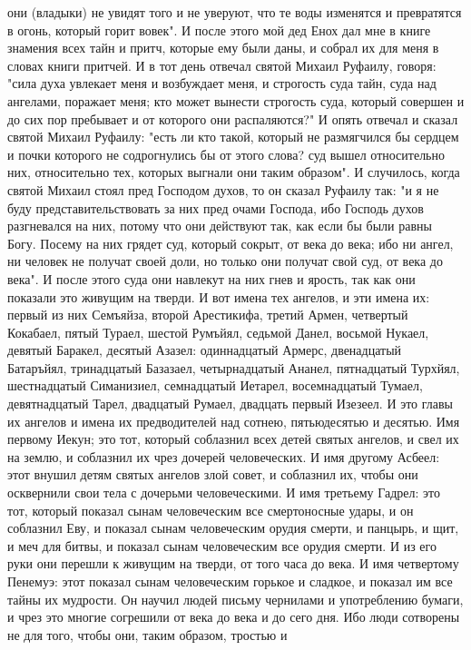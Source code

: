 они (владыки) не увидят того и не уверуют, что те воды изменятся и превратятся
в огонь, который горит вовек".
И после этого мой дед Енох дал мне в книге знамения всех тайн и
притч, которые ему были даны, и собрал их для меня в словах книги притчей.
И в тот день отвечал святой Михаил Руфаилу, говоря: "сила духа увлекает
меня и возбуждает меня, и строгость суда тайн, суда над ангелами, поражает
меня; кто может вынести строгость суда, который совершен и до сих пор пребывает
и от которого они распаляются?"
И опять отвечал и сказал святой Михаил Руфаилу: "есть ли кто такой,
который не размягчился бы сердцем и почки которого не содрогнулись бы от этого
слова?
суд вышел относительно них, относительно тех, которых выгнали они
таким образом".
И случилось, когда святой Михаил стоял пред Господом духов, то он
сказал Руфаилу так: "и я не буду представительствовать за них пред очами
Господа, ибо Господь духов разгневался на них, потому что они действуют так,
как если бы были равны Богу.
Посему на них грядет суд, который сокрыт, от века до века; ибо ни
ангел, ни человек не получат своей доли, но только они получат свой суд, от
века до века".
И после этого суда они навлекут на них гнев и ярость, так как они
показали это живущим на тверди.
И вот имена тех ангелов, и эти имена их: первый из них Семъяйза,
второй Арестикифа, третий Армен, четвертый Кокабаел, пятый Тураел, шестой
Румъйял, седьмой Данел, восьмой Нукаел, девятый Баракел, десятый Азазел:
одиннадцатый Армерс, двенадцатый Батаръйял, тринадцатый Базазаел, четырнадцатый
Ананел, пятнадцатый Турхйял, шестнадцатый Симанизиел, семнадцатый Иетарел,
восемнадцатый Тумаел, девятнадцатый Тарел, двадцатый Румаел, двадцать первый
Изезеел.
И это главы их ангелов и имена их предводителей над сотнею,
пятьюдесятью и десятью.
Имя первому Иекун; это тот, который соблазнил всех детей святых
ангелов, и свел их на землю, и соблазнил их чрез дочерей человеческих.
И имя другому Асбеел: этот внушил детям святых ангелов злой совет, и
соблазнил их, чтобы они осквернили свои тела с дочерьми человеческими.
И имя третьему Гадрел: это тот, который показал сынам человеческим все
смертоносные удары, и он соблазнил Еву, и показал сынам человеческим орудия
смерти, и панцырь, и щит, и меч для битвы, и показал сынам человеческим все
орудия смерти.
И из его руки они перешли к живущим на тверди, от того часа до века.
И имя четвертому Пенемуэ: этот показал сынам человеческим горькое и
сладкое, и показал им все тайны их мудрости.
Он научил людей письму чернилами и употреблению бумаги, и чрез это
многие согрешили от века до века и до сего дня.
Ибо люди сотворены не для того, чтобы они, таким образом, тростью и
